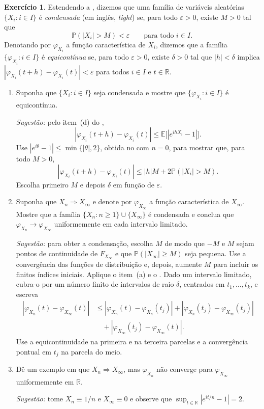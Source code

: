 \documentclass[12pt,portuguese]{article}
\theoremstyle{definition}
\theoremstyle{plainexercise}
\theoremstyle{starredexercise}
\newtheorem{starredexercise}[exercise]{Exercício}
\theoremstyle{definition}
\begin{document}
\begin{starredexercise}\label{exercise:equicontinuidade}
Estendendo a , dizemos que uma família de
variáveis aleatórias $\{X_i:i\in I\}$ é \emph{condensada} (em inglês,
\emph{tight}) se, para todo $\varepsilon>0$, existe $M>0$ tal que
\[
\mathbb{P}(|X_i|>M)<\varepsilon
\qquad\text{para todo }i\in I.
\]
Denotando por $\varphi_{X_i}$ a função característica de $X_i$, dizemos que a
família $\{\varphi_{X_i}:i\in I\}$ é \emph{equicontínua} se, para todo
$\varepsilon>0$, existe $\delta>0$ tal que $|h|<\delta$ implica
$|\varphi_{X_i}(t+h)-\varphi_{X_i}(t)|<\varepsilon$ para todos $i\in I$ e
$t\in\mathbb{R}$.

\begin{enumerate}[label=(\alph*)]
\item Suponha que $\{X_i:i\in I\}$ seja condensada e mostre que
$\{\varphi_{X_i}:i\in I\}$ é equicontínua.

\noindent\emph{Sugestão:} pelo item~(d) do ,
\[
|\varphi_{X_i}(t+h)-\varphi_{X_i}(t)|
\leqslant\mathbb{E}\bigl[|e^{ihX_i}-1|\bigr].
\]
Use $|e^{i\theta}-1|\leqslant\min\{|\theta|,2\}$, obtida no
 com $n=0$, para mostrar que, para todo $M>0$,
\[
|\varphi_{X_i}(t+h)-\varphi_{X_i}(t)|
\leqslant |h|M+2\mathbb{P}(|X_i|>M).
\]
Escolha primeiro $M$ e depois $\delta$ em função de $\varepsilon$.

\item Suponha que $X_n\Rightarrow X_\infty$ e denote por
$\varphi_{X_\infty}$ a função característica de $X_\infty$. Mostre que a
família $\{X_n:n\geqslant1\}\cup\{X_\infty\}$ é condensada e conclua que
$\varphi_{X_n}\to\varphi_{X_\infty}$ uniformemente em cada intervalo limitado.

\noindent\emph{Sugestão:} para obter a condensação, escolha $M$ de modo que $-M$ e $M$
sejam pontos de continuidade de $F_{X_\infty}$ e que
$\mathbb{P}(|X_\infty|\geqslant M)$ seja pequena. Use a convergência das
funções de distribuição e, depois, aumente $M$ para incluir os finitos
índices iniciais. Aplique o item~(a) e o . Dado um
intervalo limitado, cubra-o por um número finito de intervalos de raio
$\delta$, centrados em $t_1,\ldots,t_k$, e escreva
\[
\begin{aligned}
|\varphi_{X_n}(t)-\varphi_{X_\infty}(t)|
&\leqslant|\varphi_{X_n}(t)-\varphi_{X_n}(t_j)|
+|\varphi_{X_n}(t_j)-\varphi_{X_\infty}(t_j)|\\
&\quad+|\varphi_{X_\infty}(t_j)-\varphi_{X_\infty}(t)|.
\end{aligned}
\]
Use a equicontinuidade na primeira e na terceira parcelas e a convergência
pontual em $t_j$ na parcela do meio.

\item Dê um exemplo em que $X_n\Rightarrow X_\infty$, mas
$\varphi_{X_n}$ não converge para $\varphi_{X_\infty}$ uniformemente em
$\mathbb{R}$.

\noindent\emph{Sugestão:} tome $X_n\equiv1/n$ e $X_\infty\equiv0$ e observe que
$\sup_{t\in\mathbb{R}}|e^{it/n}-1|=2$.
\end{enumerate}
\end{starredexercise}
\end{document}
